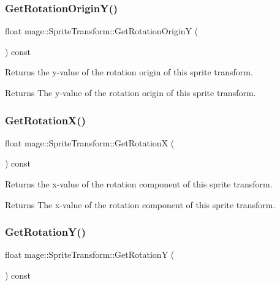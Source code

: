 \subsubsection{\texorpdfstring{Get\+Rotation\+Origin\+Y()}{GetRotationOriginY()}}
{\footnotesize\ttfamily float mage\+::\+Sprite\+Transform\+::\+Get\+Rotation\+OriginY (\begin{DoxyParamCaption}{ }\end{DoxyParamCaption}) const}

Returns the y-\/value of the rotation origin of this sprite transform.

\begin{DoxyReturn}{Returns}
The y-\/value of the rotation origin of this sprite transform. 
\end{DoxyReturn}
\hypertarget{structmage_1_1_sprite_transform_aca434c08aa95b3b2892690cb7b4dc241}{}\label{structmage_1_1_sprite_transform_aca434c08aa95b3b2892690cb7b4dc241} 
\subsubsection{\texorpdfstring{Get\+Rotation\+X()}{GetRotationX()}}
{\footnotesize\ttfamily float mage\+::\+Sprite\+Transform\+::\+Get\+RotationX (\begin{DoxyParamCaption}{ }\end{DoxyParamCaption}) const}

Returns the x-\/value of the rotation component of this sprite transform.

\begin{DoxyReturn}{Returns}
The x-\/value of the rotation component of this sprite transform. 
\end{DoxyReturn}
\hypertarget{structmage_1_1_sprite_transform_ad906e19391e8e886343f6b1ceca5f439}{}\label{structmage_1_1_sprite_transform_ad906e19391e8e886343f6b1ceca5f439} 
\subsubsection{\texorpdfstring{Get\+Rotation\+Y()}{GetRotationY()}}
{\footnotesize\ttfamily float mage\+::\+Sprite\+Transform\+::\+Get\+RotationY (\begin{DoxyParamCaption}{ }\end{DoxyParamCaption}) const}

